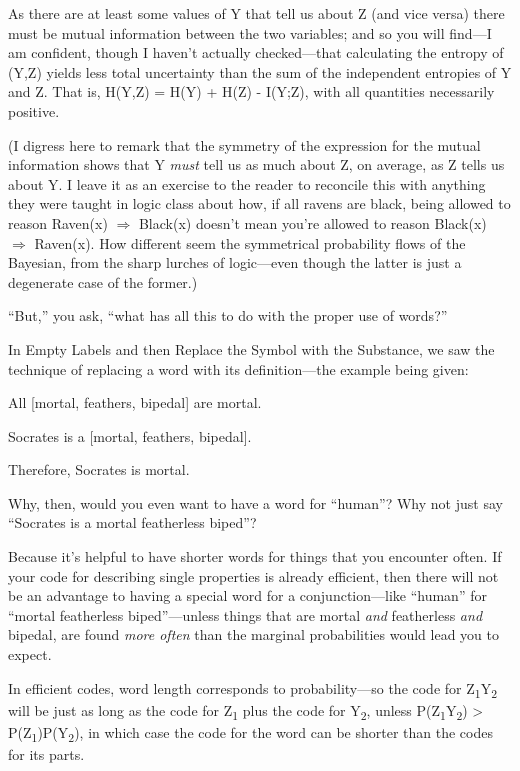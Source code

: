 {
 As there are at least some values of Y that tell us about Z (and
vice versa) there must be mutual information between the two variables;
and so you will find---I am confident, though I haven't
actually checked---that calculating the entropy of (Y,Z) yields less
total uncertainty than the sum of the independent entropies of Y and Z.
That is, H(Y,Z) = H(Y) + H(Z) - I(Y;Z), with all quantities necessarily
positive.}

{
 (I digress here to remark that the symmetry of the expression for
the mutual information shows that Y \textit{must} tell us as much about
Z, on average, as Z tells us about Y. I leave it as an exercise to the
reader to reconcile this with anything they were taught in logic class
about how, if all ravens are black, being allowed to reason Raven(x)
$\Rightarrow $ Black(x) doesn't mean
you're allowed to reason Black(x) $\Rightarrow $
Raven(x). How different seem the symmetrical probability flows of the
Bayesian, from the sharp lurches of logic---even though the latter is
just a degenerate case of the former.)}

{
 ``But,'' you ask,
``what has all this to do with the proper use of
words?''}

{
 In Empty Labels and then Replace the Symbol with the Substance, we
saw the technique of replacing a word with its definition---the example
being given:}

{
 All [mortal, {\textlnot}feathers, bipedal] are mortal.}

{
 Socrates is a [mortal, {\textlnot}feathers, bipedal].}

{
 Therefore, Socrates is mortal.}

{
 Why, then, would you even want to have a word for
``human''? Why not just say
``Socrates is a mortal featherless
biped''?}

{
 Because it's helpful to have shorter words for
things that you encounter often. If your code for describing single
properties is already efficient, then there will not be an advantage to
having a special word for a conjunction---like
``human'' for
``mortal featherless
biped''---unless things that are mortal \textit{and}
featherless \textit{and} bipedal, are found \textit{more often} than
the marginal probabilities would lead you to expect.}

{
 In efficient codes, word length corresponds to probability---so
the code for Z\textsubscript{1}Y\textsubscript{2} will be just as long
as the code for Z\textsubscript{1} plus the code for
Y\textsubscript{2}, unless P(Z\textsubscript{1}Y\textsubscript{2})
{\textgreater} P(Z\textsubscript{1})P(Y\textsubscript{2}), in which
case the code for the word can be shorter than the codes for its
parts.}


